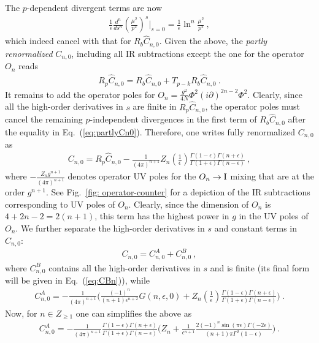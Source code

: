 \documentclass[a4paper,11pt]{article}
\begin{document}
The $p$-dependent divergent terms are now 
\begin{align}
\frac{1}{\epsilon}\frac{d^{n}}{ds^{n}} \left(\frac{\mu^2}{p^2}\right)^s\bigg|_{s=0}=\frac{1}{\epsilon}\ln^n \frac{\mu^2}{p^2} \ ,
\end{align}
which indeed cancel with that for $R_b\hat C_{n,0}$. 
Given the above, the {\it partly renormalized} $C_{n,0}$, including all IR subtractions except the one for the operator $O_{n}$ reads
\begin{align}
R_p\hat C_{n,0}=R_b\hat C_{n,0}+T_{p-k}R_b \hat C_{n,0} \ .
\end{align}
It remains to add the operator poles for $O_n=\frac{g^2}{4N}\Phi^2(i\partial)^{2n-2}\Phi^2$. Clearly, since all the high-order derivatives in $s$ are finite in $R_p\hat C_{n,0}$, the operator poles must cancel the remaining $p$-independent divergences in the first term of $R_b\hat C_{n,0}$ after the equality in Eq.~(\ref{eq:partlyCn0}). 
Therefore, one writes fully renormalized $C_{n,0}$ as 
\begin{align}\label{eq:Cn0def}
C_{n,0}=R_p\hat C_{n,0}-\frac{1}{(4\pi)^{n+1}}Z_n\left(\frac{1}{\epsilon}\right)\frac{\Gamma(1-\epsilon)\Gamma(n+\epsilon)}{\Gamma(1+\epsilon)\Gamma(n-\epsilon)} \ ,
\end{align}
where $-\frac{Z_ng^{n+1}}{(4\pi)^{n+1}}$ denotes operator UV poles for the $O_n \rightarrow{\rm I}$ mixing that are at the order $g^{n+1}$. See Fig.~\ref{fig: operator-counter} for a depiction of the IR subtractions corresponding to UV poles of $O_n$. Clearly, since the dimension of $O_n$ is $4+2n-2=2(n+1)$, this term has the highest power in $g$ in the UV poles of $O_n$. 
We further separate the high-order derivatives in $s$ and constant terms in $C_{n,0}$:
\begin{align}
C_{n,0}=C_{n,0}^A+C_{n,0}^{B} \ , 
\end{align}
where $C_{n,0}^B$ contains all the high-order derivatives in $s$ and is finite (its final form will be given in Eq.~(\ref{eq:CBn})), while 
\begin{align}
C_{n,0}^A=-\frac{1}{(4\pi)^{n+1}}\bigg(\frac{(-1)^n}{(n+1)\epsilon^{n+2}}G(n,\epsilon,0)+Z_n\left(\frac{1}{\epsilon}\right)\frac{\Gamma(1-\epsilon)\Gamma(n+\epsilon)}{\Gamma(1+\epsilon)\Gamma(n-\epsilon)}\bigg) \ .
\end{align}
Now, for $n\in Z_{\ge 1}$ one can simplifies the above as
\begin{align}\label{eq:Cnasimp}
C_{n,0}^A=-\frac{1}{(4\pi)^{n+1}}\frac{\Gamma(1-\epsilon)\Gamma(n+\epsilon)}{\Gamma(1+\epsilon)\Gamma(n-\epsilon)}\bigg(Z_n+\frac{1}{\epsilon^{n+1}}\frac{2 (-1)^n  \sin (\pi  \epsilon) \Gamma (-2 \epsilon)}{(n+1)\pi \Gamma^2 (1-\epsilon)}\bigg) \ .
\end{align}
\end{document}
